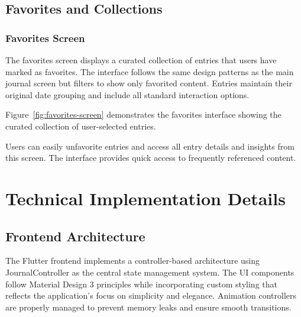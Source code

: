 
\subsection{Favorites and Collections}

\subsubsection{Favorites Screen}

The favorites screen displays a curated collection of entries that users have marked as favorites. The interface follows the same design patterns as the main journal screen but filters to show only favorited content. Entries maintain their original date grouping and include all standard interaction options.

Figure~\ref{fig:favorites-screen} demonstrates the favorites interface showing the curated collection of user-selected entries.


Users can easily unfavorite entries and access all entry details and insights from this screen. The interface provides quick access to frequently referenced content.

\section{Technical Implementation Details}

\subsection{Frontend Architecture}

The Flutter frontend implements a controller-based architecture using JournalController as the central state management system. The UI components follow Material Design 3 principles while incorporating custom styling that reflects the application's focus on simplicity and elegance. Animation controllers are properly managed to prevent memory leaks and ensure smooth transitions.

